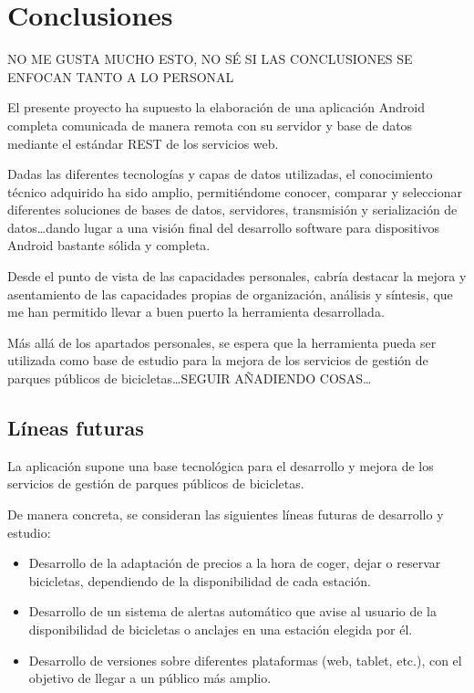 \chapter{Conclusiones}

NO ME GUSTA MUCHO ESTO, NO SÉ SI LAS CONCLUSIONES SE ENFOCAN TANTO A LO PERSONAL

El presente proyecto ha supuesto la elaboración de una aplicación Android completa comunicada de manera remota con su servidor y base de datos mediante el estándar \textsc{REST} de los servicios web.

Dadas las diferentes tecnologías y capas de datos utilizadas, el conocimiento técnico adquirido ha sido amplio, permitiéndome conocer, comparar y seleccionar diferentes soluciones de bases de datos, servidores, transmisión y serialización de datos\dots dando lugar a una visión final del desarrollo software para dispositivos Android bastante sólida y completa.

Desde el punto de vista de las capacidades personales, cabría destacar la mejora y asentamiento de las capacidades propias de organización, análisis y síntesis, que me han permitido llevar a buen puerto la herramienta desarrollada.

Más allá de los apartados personales, se espera que la herramienta pueda ser utilizada como base de estudio para la mejora de los servicios de gestión de parques públicos de bicicletas\dots SEGUIR AÑADIENDO COSAS\dots


\section{Líneas futuras}

La aplicación supone una base tecnológica para el desarrollo y mejora de los servicios de gestión de parques públicos de bicicletas.

De manera concreta, se consideran las siguientes líneas futuras de desarrollo y estudio:

\begin{itemize}  
	\item Desarrollo de la adaptación de precios a la hora de coger, dejar o reservar bicicletas, dependiendo de la disponibilidad de cada estación.
	\item Desarrollo de un sistema de alertas automático que avise al usuario de la disponibilidad de bicicletas o anclajes en una estación elegida por él.
	\item Desarrollo de versiones sobre diferentes plataformas (web, tablet, etc.), con el objetivo de llegar a un público más amplio.
\end{itemize}